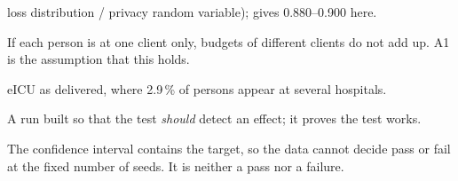 \documentclass[11pt,a4paper]{article}
\begin{document}
\begin{description}
loss distribution / privacy random variable); gives 0.880--0.900 here.
\item[Parallel composition, A1] If each person is at one client only, budgets of
different clients do not add up. A1 is the assumption that this holds.
\item[Source partition] eICU as delivered, where 2.9\,\% of persons appear at
several hospitals.
\item[Positive control] A run built so that the test \emph{should} detect an
effect; it proves the test works.
\item[Inconclusive] The confidence interval contains the target, so the data
cannot decide pass or fail at the fixed number of seeds. It is neither a pass
nor a failure.
\end{description}
\end{document}
